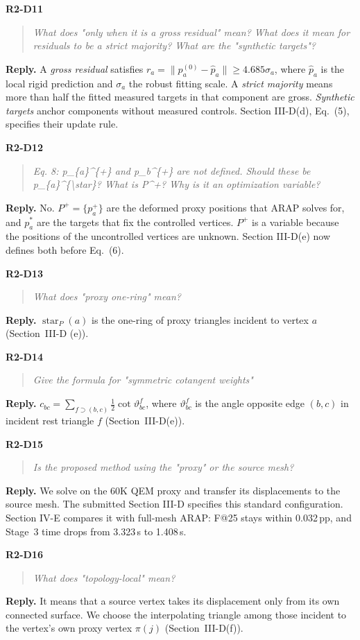 \documentclass[11pt,a4paper]{article}
\newcommand{\point}[2]{\par\medskip\textbf{#1}\par\begin{quote}\itshape #2\end{quote}}
\newenvironment{reply}{\begingroup\color{replyblue}\textbf{Reply.} }{\par\endgroup}
\begin{document}
\point{R2-D11}{What does "only when it is a gross residual" mean? What does it mean for residuals to be a strict majority? What are the "synthetic targets"?}
\begin{reply}
A \emph{gross residual} satisfies $r_a=\|p_a^{(0)}-\hat p_a\|\ge4.685\sigma_a$, where $\hat p_a$ is the local rigid prediction and $\sigma_a$ the robust fitting scale. A \emph{strict majority} means more than half the fitted measured targets in that component are gross. \emph{Synthetic targets} anchor components without measured controls. Section III-D(d), Eq.~(5), specifies their update rule.
\end{reply}

\point{R2-D12}{Eq. 8: p\_\{a\}\textasciicircum{}\{+\} and p\_b\textasciicircum{}\{+\} are not defined. Should these be p\_\{a\}\textasciicircum{}\{\textbackslash{}star\}? What is P\textasciicircum{}+? Why is it an optimization variable?}
\begin{reply}
No. $P^+=\{p_a^+\}$ are the deformed proxy positions that ARAP solves for, and $p_a^*$ are the targets that fix the controlled vertices. $P^+$ is a variable because the positions of the uncontrolled vertices are unknown. Section III-D(e) now defines both before Eq.~(6).
\end{reply}

\point{R2-D13}{What does "proxy one-ring" mean?}
\begin{reply}
$\operatorname{star}_P(a)$ is the one-ring of proxy triangles incident to vertex $a$ (Section~III-D (e)).
\end{reply}

\point{R2-D14}{Give the formula for "symmetric cotangent weights"}
\begin{reply}
$c_{bc}=\sum_{f\supset(b,c)}\tfrac12\cot\vartheta^f_{bc}$, where $\vartheta^f_{bc}$ is the angle opposite edge $(b,c)$ in incident rest triangle $f$ (Section~III-D(e)).
\end{reply}

\point{R2-D15}{Is the proposed method using the "proxy" or the source mesh?}
\begin{reply}
We solve on the 60K QEM proxy and transfer its displacements to the source mesh. The submitted Section III-D specifies this standard configuration. Section IV-E compares it with full-mesh ARAP: F@25 stays within 0.032\,pp, and Stage~3 time drops from 3.323\,s to 1.408\,s.
\end{reply}

\point{R2-D16}{What does "topology-local" mean?}
\begin{reply}
It means that a source vertex takes its displacement only from its own connected surface. We choose the interpolating triangle among those incident to the vertex's own proxy vertex $\pi(j)$ (Section~III-D(f)).
\end{reply}
\end{document}
